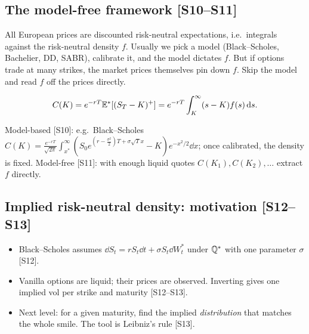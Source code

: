 \documentclass[10pt]{article}
\begin{document}
\subsection{The model-free framework [S10--S11]}
\begin{idea}
All European prices are discounted risk-neutral expectations, i.e.\ integrals against the risk-neutral density $f$. Usually we pick a model (Black--Scholes, Bachelier, DD, SABR), calibrate it, and the model dictates $f$. But if options trade at many strikes, the market prices themselves pin down $f$. Skip the model and read $f$ off the prices directly.
\end{idea}
\[C(K)=e^{-rT}\mathbb{E}^*[(S_T-K)^+]=e^{-rT}\int_K^\infty(s-K)f(s)\,\mathrm{d} s.\]
\begin{where}
\end{where}
Model-based [S10]: e.g.\ Black--Scholes $C(K)=\frac{e^{-rT}}{\sqrt{2\pi}}\int_{x^*}^\infty(S_0e^{(r-\frac{\sigma^2}{2})T+\sigma\sqrt Tx}-K)e^{-x^2/2}\dd x$; once calibrated, the density is fixed. Model-free [S11]: with enough liquid quotes $C(K_1),C(K_2),\dots$ extract $f$ directly.

\subsection{Implied risk-neutral density: motivation [S12--S13]}
\begin{itemize}
\item Black--Scholes assumes $\dd S_t=rS_t\dd t+\sigma S_t\dd W^*_t$ under $\mathbb{Q}^*$ with one parameter $\sigma$ [S12].
\item Vanilla options are liquid; their prices are observed. Inverting gives one implied vol per strike and maturity [S12--S13].
\item Next level: for a given maturity, find the implied \emph{distribution} that matches the whole smile. The tool is Leibniz's rule [S13].
\end{itemize}
\end{document}
